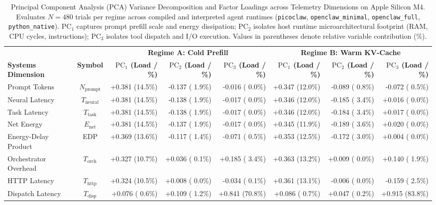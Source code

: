 \begin{table}[t]
\centering
\caption{Principal Component Analysis (PCA) Variance Decomposition and Factor Loadings across Telemetry Dimensions on Apple Silicon M4. Evaluates $N=480$ trials per regime across compiled and interpreted agent runtimes (\texttt{picoclaw}, \texttt{openclaw\_minimal}, \texttt{openclaw\_full}, \texttt{python\_native}). $\text{PC}_1$ captures prompt prefill scale and energy dissipation; $\text{PC}_2$ isolates host runtime microarchitectural footprint (RAM, CPU cycles, instructions); $\text{PC}_3$ isolates tool dispatch and I/O execution. Values in parentheses denote relative variable contribution (\%).}
\label{tab:pca_loadings}
\small
\begin{tabular}{l c r r r r r r}
\hline
 & & \multicolumn{3}{c}{\textbf{Regime A: Cold Prefill}} & \multicolumn{3}{c}{\textbf{Regime B: Warm KV-Cache}} \\
\cmidrule(lr){3-5} \cmidrule(lr){6-8}
\textbf{Systems Dimension} & \textbf{Symbol} & \textbf{$\text{PC}_1$ (Load / \%)} & \textbf{$\text{PC}_2$ (Load / \%)} & \textbf{$\text{PC}_3$ (Load / \%)} & \textbf{$\text{PC}_1$ (Load / \%)} & \textbf{$\text{PC}_2$ (Load / \%)} & \textbf{$\text{PC}_3$ (Load / \%)} \\
\hline
Prompt Tokens & $N_{\text{prompt}}$ & +0.381 (14.5\%) & -0.137 ( 1.9\%) & -0.016 ( 0.0\%) & +0.347 (12.0\%) & -0.089 ( 0.8\%) & -0.072 ( 0.5\%) \\
Neural Latency & $T_{\text{neural}}$ & +0.381 (14.5\%) & -0.138 ( 1.9\%) & -0.017 ( 0.0\%) & +0.346 (12.0\%) & -0.185 ( 3.4\%) & +0.016 ( 0.0\%) \\
Task Latency & $T_{\text{task}}$ & +0.381 (14.5\%) & -0.138 ( 1.9\%) & -0.017 ( 0.0\%) & +0.346 (12.0\%) & -0.184 ( 3.4\%) & +0.017 ( 0.0\%) \\
Net Energy & $E_{\text{net}}$ & +0.381 (14.5\%) & -0.137 ( 1.9\%) & -0.017 ( 0.0\%) & +0.345 (11.9\%) & -0.189 ( 3.6\%) & +0.020 ( 0.0\%) \\
Energy-Delay Product & EDP & +0.369 (13.6\%) & -0.117 ( 1.4\%) & -0.071 ( 0.5\%) & +0.353 (12.5\%) & -0.172 ( 3.0\%) & +0.004 ( 0.0\%) \\
Orchestrator Overhead & $T_{\text{orch}}$ & +0.327 (10.7\%) & +0.036 ( 0.1\%) & +0.185 ( 3.4\%) & +0.363 (13.2\%) & +0.009 ( 0.0\%) & +0.140 ( 1.9\%) \\
HTTP Latency & $T_{\text{http}}$ & +0.324 (10.5\%) & +0.008 ( 0.0\%) & -0.034 ( 0.1\%) & +0.361 (13.1\%) & -0.006 ( 0.0\%) & -0.159 ( 2.5\%) \\
Dispatch Latency & $T_{\text{disp}}$ & +0.076 ( 0.6\%) & +0.109 ( 1.2\%) & +0.841 (70.8\%) & +0.086 ( 0.7\%) & +0.047 ( 0.2\%) & +0.915 (83.8\%) \\

\end{tabular}
\end{table}
